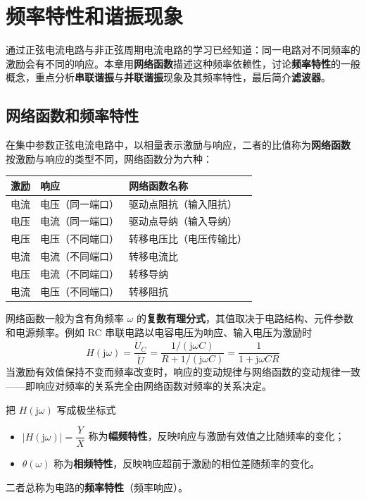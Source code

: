 \chapter{频率特性和谐振现象}

\noindent
通过正弦电流电路与非正弦周期电流电路的学习已经知道：同一电路对不同频率的激励会有不同的响应。本章用\textbf{网络函数}描述这种频率依赖性，讨论\textbf{频率特性}的一般概念，重点分析\textbf{串联谐振}与\textbf{并联谐振}现象及其频率特性，最后简介\textbf{滤波器}。

\section{网络函数和频率特性}
在集中参数正弦电流电路中，以相量表示激励与响应，二者的比值称为\textbf{网络函数}
按激励与响应的类型不同，网络函数分为六种：

\begin{center}
\begin{tabular}{@{}lll@{}}
\toprule
激励 & 响应 & 网络函数名称 \\
\midrule
电流 & 电压（同一端口） & 驱动点阻抗（输入阻抗） \\
电压 & 电流（同一端口） & 驱动点导纳（输入导纳） \\
电压 & 电压（不同端口） & 转移电压比（电压传输比）\\
电流 & 电流（不同端口） & 转移电流比 \\
电压 & 电流（不同端口） & 转移导纳 \\
电流 & 电压（不同端口） & 转移阻抗 \\
\bottomrule
\end{tabular}
\end{center}

网络函数一般为含有角频率 $\omega$ 的\textbf{复数有理分式}，其值取决于电路结构、元件参数和电源频率。例如 RC 串联电路以电容电压为响应、输入电压为激励时
\begin{equation}
H(\mathrm{j}\omega)=\frac{\dot{U}_C}{\dot{U}}
=\frac{1/\left(\mathrm{j}\omega C\right)}{R+1/\left(\mathrm{j}\omega C\right)}
=\frac{1}{1+\mathrm{j}\omega CR}
\end{equation}
当激励有效值保持不变而频率改变时，响应的变动规律与网络函数的变动规律一致——即响应对频率的关系完全由网络函数对频率的关系决定。

把 $H(\mathrm{j}\omega)$ 写成极坐标式
\begin{itemize}
  \item $\left|H(\mathrm{j}\omega)\right|=\dfrac{Y}{X}$ 称为\textbf{幅频特性}，反映响应与激励有效值之比随频率的变化；
  \item $\theta(\omega)$ 称为\textbf{相频特性}，反映响应超前于激励的相位差随频率的变化。
\end{itemize}
二者总称为电路的\textbf{频率特性}（频率响应）。

